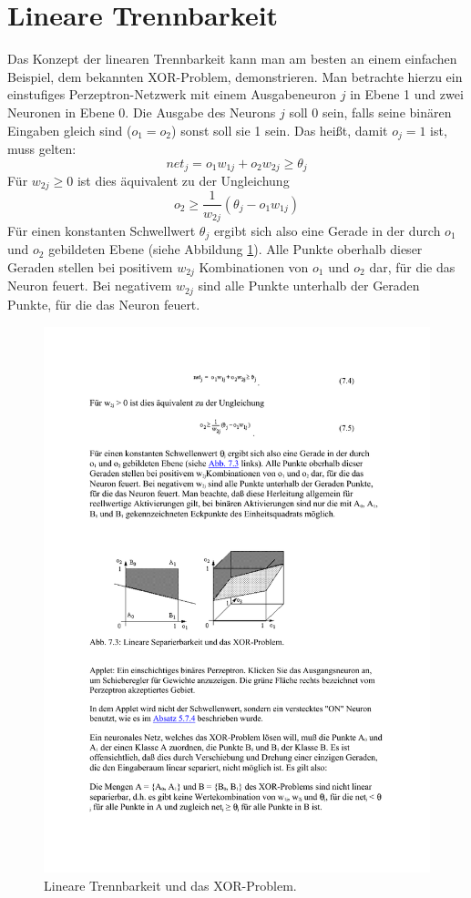 \section*{Lineare Trennbarkeit}
Das Konzept der linearen Trennbarkeit kann man am besten an einem einfachen Beispiel, dem bekannten XOR-Problem, demonstrieren. Man betrachte hierzu ein einstufiges Perzeptron-Netzwerk mit einem Ausgabeneuron $j$ in Ebene 1 und zwei Neuronen in Ebene 0. Die Ausgabe des Neurons $j$ soll 0 sein, falls seine binären Eingaben gleich sind ($o_1 = o_2$) sonst soll sie 1 sein. Das heißt, damit $o_j = 1$ ist, muss gelten:
\[
	net_j = o_1 w_{1j} + o_2 w_{2j} \ge \theta_j
\]
Für $w_{2j} \ge 0$ ist dies äquivalent zu der Ungleichung
\[
	o_2 \ge \frac{1}{w_{2j}} ( \theta_j - o_1 w_{1j})
\]
Für einen konstanten Schwellwert $\theta_j$ ergibt sich also eine Gerade in der durch $o_1$ und $o_2$ gebildeten Ebene (siehe Abbildung \ref{fig:lineare-separierbarkeit}). Alle Punkte oberhalb dieser Geraden stellen bei positivem $w_{2j}$ Kombinationen von $o_1$ und $o_2$ dar, für die das Neuron feuert. Bei negativem $w_{2j}$ sind alle Punkte unterhalb der Geraden Punkte, für die das Neuron feuert.

\begin{figure}[ht!] \centering 
	\includegraphics[width=\linewidth]{figures/ch02_lineare-trennbarkeit.pdf}
	\caption{Lineare Trennbarkeit und das XOR-Problem.}
	\label{fig:lineare-separierbarkeit}
\end{figure}

